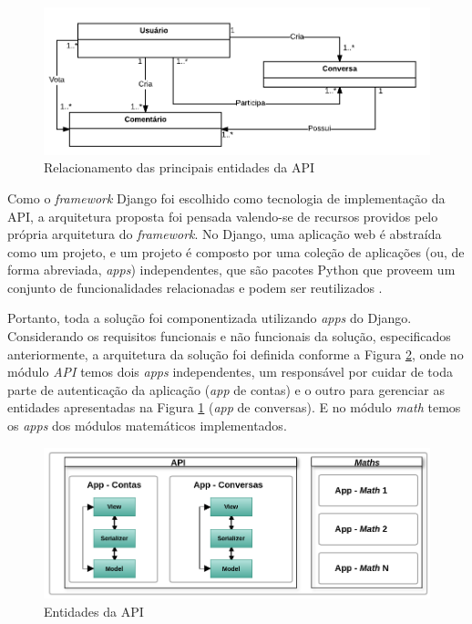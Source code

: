 \begin{figure}[h!]
\centering
\includegraphics[scale=0.5]{figuras/entidades.png}
\caption{Relacionamento das principais entidades da API}
\label{fig:entidades}
\end{figure}

Como o \textit{framework} Django foi escolhido como tecnologia de implementação da API, a arquitetura proposta foi pensada valendo-se de 
recursos providos pelo própria arquitetura do \textit{framework}.
No Django, uma aplicação web é abstraída como um projeto, e um projeto é composto por uma coleção de aplicações
(ou, de forma abreviada, \textit{apps}) independentes, que
são pacotes Python que proveem um conjunto de funcionalidades relacionadas e podem ser reutilizados \cite{django_apps}.

Portanto, toda a solução foi componentizada utilizando \textit{apps} do 
Django. Considerando os requisitos funcionais e não funcionais da solução, especificados anteriormente, a arquitetura da solução foi definida 
conforme a Figura \ref{fig:arquitetura_api}, onde no módulo \textit{API} temos dois \textit{apps} independentes, um responsável
por cuidar de toda parte de autenticação da aplicação (\textit{app} de contas) e o outro para gerenciar as entidades apresentadas na
Figura \ref{fig:entidades} (\textit{app} de conversas). E no módulo \textit{math} temos os \textit{apps} dos módulos matemáticos implementados.

\begin{figure}[h!]
\centering
\includegraphics[scale=0.5]{figuras/arquitetura_api.png}
\caption{Entidades da API}
\label{fig:arquitetura_api}
\end{figure}

